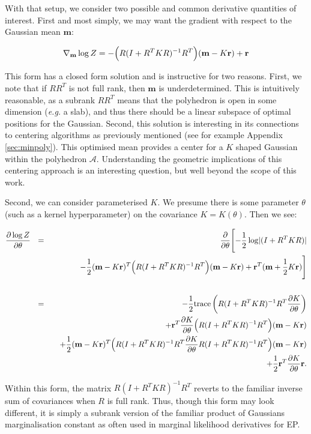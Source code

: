 \documentclass[twoside,11pt]{article}
\def\r{{\mathbf r}}
\def\m{{\mathbf m}}
\def\regionA{\mathcal{A}}
\begin{document}
With that setup, we consider two possible and common derivative quantities of interest.  First and most simply, we may want the gradient with respect to the Gaussian mean $\m$:

\begin{equation}
\nabla_{\m} \log Z = - \Bigl(R(I + R^TKR)^{-1}R^T\Bigr)(\m - K\r) + \r
\end{equation}

\noindent This form has a closed form solution and is instructive for two reasons.  First, we note that if $RR^T$ is not full rank, then $\m$ is underdetermined.  This is intuitively reasonable, as a subrank $RR^T$ means that the polyhedron is open in some dimension ({\it e.g.} a slab), and thus there should be a linear subspace of optimal positions for the Gaussian.  Second, this solution is interesting in its connections to centering algorithms as previously mentioned (see for example Appendix \ref{sec:minpoly}).  This optimised mean provides a center for a $K$ shaped Gaussian within the polyhedron $\regionA$.  Understanding the geometric implications of this centering approach is an interesting question, but well beyond the scope of this work. 

Second,  we can consider parameterised $K$.  We presume there is some parameter $\theta$ (such as a kernel hyperparameter) on the covariance $K = K(\theta)$.  Then we see: 

\begin{eqnarray}
\label{eqn:dlogZ3}
\frac{\partial \log Z}{\partial \theta}
~~& = & ~~~
\frac{\partial}{\partial \theta} \Biggl[ -\frac{1}{2}\log\lvert (I + R^TKR) \rvert    \nonumber
\\ && ~~~~~~~~~~
-\frac{1}{2} (\m -K\r)^T\Bigl( R(I + R^TKR)^{-1}R^T\Bigr)(\m - K\r) + \r^T(\m + \frac{1}{2}K\r) \Biggr]
\nonumber
\\
&& \nonumber
\\
~~& = & ~~~
-\frac{1}{2}\text{trace}\left( R(I + R^TKR)^{-1}R^T\frac{\partial K}{\partial \theta} \right)   \nonumber
\\ && ~~~
+ \r^T \frac{\partial K}{\partial \theta} \Bigl(R(I + R^TKR)^{-1}R^T\Bigr)(\m - K\r)  \nonumber
\\ && ~~~
+ \frac{1}{2} (\m -K\r)^T\Bigl(R(I + R^TKR)^{-1}R^T\frac{\partial K}{\partial \theta}R(I + R^TKR)^{-1}R^T\Bigr)(\m - K\r)  \nonumber
\\ && ~~~
+ \frac{1}{2}\r^T\frac{\partial K}{\partial \theta}\r.
\end{eqnarray}

\noindent Within this form, the matrix $R(I + R^TKR)^{-1}R^T$ reverts to the familiar inverse sum of covariances when $R$ is full rank.  Thus, though this form may look different, it is simply a subrank version of the familiar product of Gaussians marginalisation constant as often used in marginal likelihood derivatives for EP.
\end{document}
